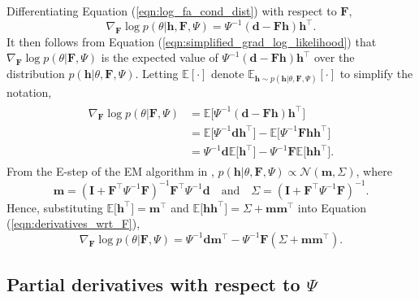 \documentclass[msc,deptreport.inf]{infthesis} %
\newcommand{\matr}[1]{\mathbf{#1}}
\newcommand{\E}{\mathbb E}
\begin{document}
Differentiating Equation (\ref{eqn:log_fa_cond_dist}) with respect to $\matr{F}$,
\begin{equation}
	\nabla_{\matr{F}} \log p(\theta | \matr{h}, \matr{F}, \Psi)
	= \Psi^{-1} (\matr{d} - \matr{Fh}) \matr{h}^\intercal.
\end{equation}
It then follows from Equation (\ref{eqn:simplified_grad_log_likelihood}) that $\nabla_{\matr{F}} \log p(\theta | \matr{F}, \Psi)$ is the expected value of $\Psi^{-1} (\matr{d} - \matr{Fh}) \matr{h}^\intercal$ over the distribution $p(\matr{h} | \theta, \matr{F}, \Psi)$. Letting $\E[\cdot]$ denote $\E_{\matr{h} \sim p(\matr{h} | \theta, \matr{F}, \Psi)}[\cdot]$ to simplify the notation, 
\begin{align}\label{eqn:derivatives_wrt_F}
\begin{split}
	\nabla_{\matr{F}} \log p(\theta | \matr{F}, \Psi) 
	& = \E \big[ \Psi^{-1} (\matr{d} - \matr{Fh}) \matr{h}^\intercal \big] \\
	& = \E \big[ \Psi^{-1} \matr{d} \matr{h}^\intercal \big] 
	- \E \big[ \Psi^{-1} \matr{Fh} \matr{h}^\intercal \big] \\
	& = \Psi^{-1} \matr{d} \E \big[ \matr{h}^\intercal \big] 
	- \Psi^{-1} \matr{F}  \E \big[ \matr{h} \matr{h}^\intercal \big].
\end{split}
\end{align} 
From the E-step of the EM algorithm in \cite{barber2007}, $p(\matr{h} | \theta, \matr{F}, \Psi) \propto \mathcal{N}(\matr{m}, \Sigma)$, where
\begin{equation}\label{eqn:variational_params}
	\matr{m} = (\matr{I} + \matr{F}^\intercal \Psi^{-1} \matr{F})^{-1} \matr{F}^\intercal \Psi^{-1} \matr{d}
	\quad \text{and} \quad \Sigma = (\matr{I} + \matr{F}^\intercal \Psi^{-1} \matr{F})^{-1}.
\end{equation}
Hence, substituting $\E \big[ \matr{h}^\intercal \big] = \matr{m}^\intercal$ and $\E \big[ \matr{h} \matr{h}^\intercal \big] = \Sigma + \matr{m} \matr{m}^\intercal$ into Equation (\ref{eqn:derivatives_wrt_F}), 
\begin{equation}
	\nabla_{\matr{F}} \log p(\theta | \matr{F}, \Psi) 
	= \Psi^{-1} \matr{d} \matr{m}^\intercal
	- \Psi^{-1} \matr{F}  (\Sigma + \matr{m} \matr{m}^\intercal).
\end{equation}

\subsection{Partial derivatives with respect to $\Psi$}
\end{document}
